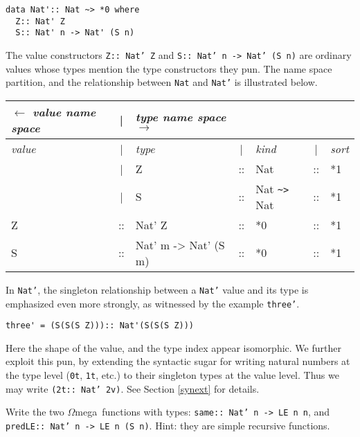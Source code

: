 \documentclass[11pt,twoside,A4]{llncs}
\newcommand{\om}{\emph{$\Omega$}mega}
\begin{document}
{\small
\begin{verbatim}
data Nat':: Nat ~> *0 where
  Z:: Nat' Z
  S:: Nat' n -> Nat' (S n)
\end{verbatim}}

\noindent
The value constructors {\tt Z:: Nat' Z} and {\tt S:: Nat' n ->
Nat' (S n)} are ordinary values whose types mention the type
constructors they pun. The name space partition, and the relationship
between {\tt Nat} and {\tt Nat'} is illustrated below.

\vspace*{.1in}
{\tt {\small
\begin{tabular}{|lclclcl|} \hline
  $\leftarrow$     {\it {\tiny value name space}}&|& {\it {\tiny type name space $\rightarrow$}} & &  && \\ \hline
{\em value}&|& {\em type} &|&  {\em kind} &|& {\em sort} \\ \hline
     & |& Z        &::& Nat &::& *1 \\
     & |& S        &::& Nat \verb+~>+ Nat &::& *1 \\   \hline  
Z &::& Nat' Z &::& *0 &::& *1 \\
S &::& Nat' m -> Nat' (S m) &::& *0 &::& *1 \\
\hline
\end{tabular}}}
\vspace*{.1in}

\noindent
In {\tt Nat'}, the singleton relationship
between a {\tt Nat'} value and its type is emphasized even more
strongly, as witnessed by the example {\tt three'}. 

\vspace*{-.05in}
{\small
\begin{verbatim}
three' = (S(S(S Z))):: Nat'(S(S(S Z)))
\end{verbatim}}

\noindent
Here the
shape of the value, and the type index appear isomorphic.
We further exploit this pun, by extending the syntactic sugar
for writing natural numbers at the type level ({\tt 0t}, {\tt 1t},  etc.) to their
singleton types at the value level. Thus we may write
{\tt (2t:: Nat' 2v)}. See Section \ref{synext} for details.

\begin{exercise} \label{pred}
Write the two \om\ functions with types: {\tt same:: Nat' n -> LE n n},
and {\tt predLE:: Nat' n -> LE n (S n)}. Hint: they are simple
recursive functions.
\end{exercise}
\end{document}
